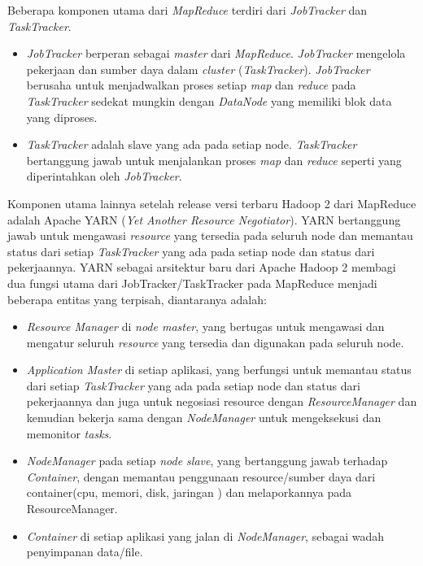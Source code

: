 	Beberapa komponen utama dari \textit{MapReduce} terdiri dari \textit{JobTracker} dan \textit{TaskTracker}.
	\begin{itemize}
		\item \textit{JobTracker} berperan sebagai \textit{master} dari \textit{MapReduce}. \textit{JobTracker} mengelola pekerjaan dan sumber daya dalam \textit{cluster} (\textit{TaskTracker}). \textit{JobTracker} berusaha untuk menjadwalkan proses setiap \textit{map} dan \textit{reduce} pada \textit{TaskTracker} sedekat mungkin dengan \textit{DataNode} yang memiliki blok data yang diproses.
		\item \textit{TaskTracker} adalah slave yang ada pada setiap node. \textit{TaskTracker} bertanggung jawab untuk menjalankan proses \textit{map} dan \textit{reduce} seperti yang diperintahkan oleh \textit{JobTracker}.
	\end{itemize}
		
		Komponen utama lainnya setelah release versi terbaru Hadoop 2 dari MapReduce adalah Apache YARN (\textit{Yet Another Resource Negotiator}). YARN bertanggung jawab untuk mengawasi \textit{resource} yang tersedia pada seluruh node dan memantau status dari setiap \textit{TaskTracker} yang ada pada setiap node dan status dari pekerjaannya. YARN sebagai arsitektur baru dari Apache Hadoop 2 membagi dua fungsi utama dari JobTracker/TaskTracker pada MapReduce menjadi beberapa entitas yang terpisah, diantaranya adalah: 
		\begin{itemize}
			\item \textit{Resource Manager} di \textit{node master}, yang bertugas untuk mengawasi dan mengatur seluruh \textit{resource} yang tersedia dan digunakan pada seluruh node.
			\item \textit{Application Master} di setiap aplikasi, yang berfungsi untuk memantau status dari setiap \textit{TaskTracker} yang ada pada setiap node dan status dari pekerjaannya dan juga untuk negosiasi resource dengan \textit{ResourceManager} dan kemudian bekerja sama dengan \textit{NodeManager} untuk mengeksekusi dan memonitor \textit{tasks}.
			\item \textit{NodeManager} pada setiap \textit{node slave}, yang bertanggung jawab terhadap \textit{Container}, dengan memantau penggunaan resource/sumber daya dari container(cpu, memori, disk, jaringan ) dan melaporkannya pada ResourceManager.
			\item \textit{Container} di setiap aplikasi yang jalan di \textit{NodeManager}, sebagai wadah penyimpanan data/file.
		\end{itemize}
		
